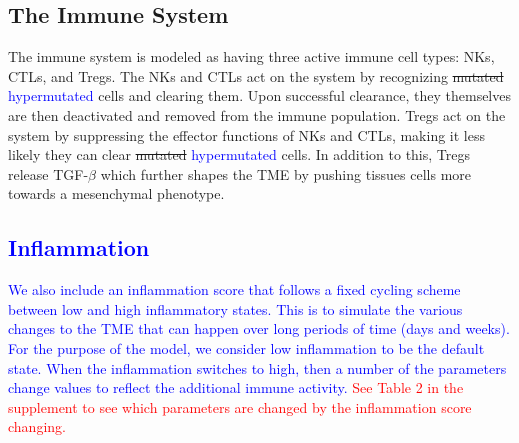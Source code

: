 \documentclass[11pt]{article}
\newcommand{\tcr} { \textcolor{red} }
\newcommand{\tcb} { \textcolor{blue} }
\begin{document}
\subsection{The Immune System}\label{ImmuneSystem}
The immune system is modeled as having three active immune cell types: NKs, CTLs, and Tregs.
The NKs and CTLs act on the system by recognizing \sout{mutated} \tcb{hypermutated} cells and clearing them.
Upon successful clearance, they themselves are then deactivated and removed from the immune population.
Tregs act on the system by suppressing the effector functions of NKs and CTLs, making it less likely they can clear \sout{mutated} \tcb{hypermutated} cells.
In addition to this, Tregs release TGF-$\beta$ which further shapes the TME by pushing tissues cells more towards a mesenchymal phenotype.

\tcb{
\subsection{Inflammation} %
We also include an inflammation score that follows a fixed cycling scheme between low and high inflammatory states.
This is to simulate the various changes to the TME that can happen over long periods of time (days and weeks).
For the purpose of the model, we consider low inflammation to be the default state.
When the inflammation switches to high, then a number of the parameters change values to reflect the additional immune activity.
\tcr{See Table 2 in the supplement to see which parameters are changed by the inflammation score changing.} %
}
\end{document}
